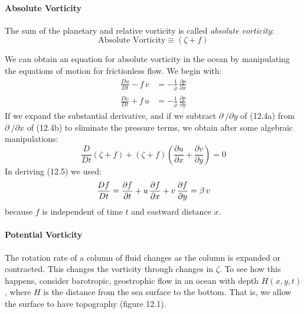 \paragraph{Absolute Vorticity}
The sum of the planetary and relative vorticity is called
\textit{absolute vorticity}:
\begin{equation}
\boxed{ \text{Absolute Vorticity} \equiv (\zeta + f) }
\end{equation}

We can obtain an equation for absolute vorticity in the ocean by
manipulating the equations of motion for frictionless flow. We begin
with:
\begin{subequations}
\begin{align}
\frac{Du}{Dt} -f\,v &= -\frac{1}{\rho}\,\frac{\partial{p}}{\partial{x}} \\
\frac{Dv}{Dt} +f\,u &= -\frac{1}{\rho}\,\frac{\partial{p}}{\partial{y}}
\end{align}
\end{subequations}
If we expand the substantial derivative, and if we subtract
$\partial\:/\partial{y}$ of (12.4a) from $\partial\:/\partial{x}$ of (12.4b)
to eliminate the pressure terms, we obtain after some
algebraic manipulations:
\begin{equation}
\boxed{ \frac{D}{Dt}\left(\zeta +f  \right) + \left(\zeta +f  \right)
\left(\frac{\partial{u}}{\partial{x}} +
\frac{\partial{v}}{\partial{y}} \right) = 0 }
\end{equation}
In deriving (12.5) we used:
\begin{equation}
\frac{Df}{Dt} = \frac{\partial{f}}{\partial{t}}
+u\,\frac{\partial{f}}{\partial{x}} +v\,\frac{\partial{f}}{\partial{y}} = \beta
\,v \notag
\end{equation}
because $f$ is independent of time $t$ and eastward distance $x$.

\paragraph{Potential Vorticity}
The rotation rate of a column of fluid changes as the column is
expanded or contracted. This changes the vorticity through changes in
$\zeta$. To see how this happens, consider barotropic,
geostrophic flow in an ocean
with depth $H(x, y, t)$, where $H$ is the distance from the sea
surface to the bottom. That is, we allow the surface to have
topography (figure 12.1).

